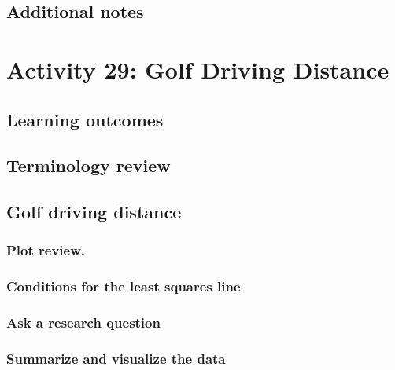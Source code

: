 \documentclass[
]{report}
\begin{document}
\subsection{Additional notes}\label{additional-notes-27}

\section{Activity 29: Golf Driving Distance}\label{activity-29-golf-driving-distance}

\subsection{Learning outcomes}\label{learning-outcomes-33}

\subsection{Terminology review}\label{terminology-review-26}

\subsection{Golf driving distance}\label{golf-driving-distance}

\subsubsection*{Plot review.}\label{plot-review.}

\subsubsection*{Conditions for the least squares line}\label{conditions-for-the-least-squares-line}

\subsubsection*{Ask a research question}\label{ask-a-research-question-7}

\subsubsection*{Summarize and visualize the data}\label{summarize-and-visualize-the-data-6}
\end{document}
